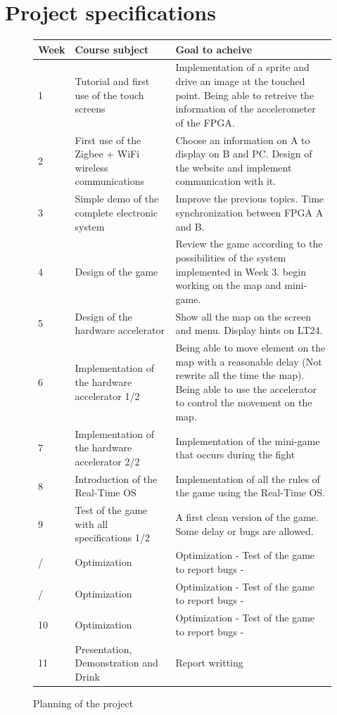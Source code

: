 \documentclass[10pt,a4paper]{article}
\begin{document}
\newpage
\section{Project specifications}

\begin{figure}[h!]
\centering
\begin{tabular}{|p{}||p{}|p{}|}
    \hline
    Week & Course subject & Goal to acheive   \\
    \hline \hline 
    1   &  Tutorial and first use of the touch screens &  Implementation of a sprite and drive an image at the touched point. Being able to retreive the information of the accelerometer of the FPGA. \\ \hline 
    2   &  First use of the Zigbee + WiFi wireless communications & Choose an information on A to display on B and PC. Design of the website and implement communication with it.  \\ \hline 
    3   &  Simple demo of the complete electronic system & Improve the previous topics. Time synchronization between FPGA A and B. \\ \hline 
    4   &  Design of the game &  Review the game according to the possibilities of the system implemented in Week 3. begin working on the map and mini-game.  \\ \hline 
    5   &  Design of the hardware accelerator &  Show all the map on the screen and menu. Display hints on LT24.  \\ \hline 
    6   &  Implementation of the hardware accelerator 1/2 &  Being able to move element on the map with a reasonable delay (Not rewrite all the time the map). Being able to use the accelerator to control the movement on the map. \\ \hline 
    7   &  Implementation of the hardware accelerator 2/2 &  Implementation of the mini-game that occurs during the fight \\ \hline 
    8   &  Introduction of the Real-Time OS &  Implementation of all the rules of the game using the Real-Time OS.  \\ \hline 
    9   &  Test of the game with all specifications 1/2 &   A first clean version of the game. Some delay or bugs are allowed. \\ \hline 
    /   &  Optimization &  Optimization - Test of the game to report bugs -\\ \hline 
    /   &  Optimization &  Optimization - Test of the game to report bugs - \\ \hline 
    10  &  Optimization &  Optimization - Test of the game to report bugs -\\ \hline 
    11  &  Presentation, Demonstration and Drink  &  Report writting  \\ \hline 
\end{tabular}
\caption{Planning of the project}
\end{figure}
\end{document}
